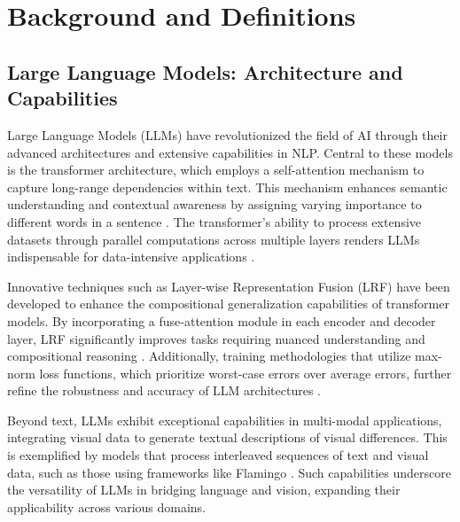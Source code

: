 \section{Background and Definitions} \label{sec:Background and Definitions}



\subsection{Large Language Models: Architecture and Capabilities} \label{subsec:Large Language Models: Architecture and Capabilities}



Large Language Models (LLMs) have revolutionized the field of AI through their advanced architectures and extensive capabilities in NLP. Central to these models is the transformer architecture, which employs a self-attention mechanism to capture long-range dependencies within text. This mechanism enhances semantic understanding and contextual awareness by assigning varying importance to different words in a sentence \cite{bogoychev2020domaintranslationesenoisesynthetic}. The transformer's ability to process extensive datasets through parallel computations across multiple layers renders LLMs indispensable for data-intensive applications \cite{zheng2023layerwiserepresentationfusioncompositional}.



Innovative techniques such as Layer-wise Representation Fusion (LRF) have been developed to enhance the compositional generalization capabilities of transformer models. By incorporating a fuse-attention module in each encoder and decoder layer, LRF significantly improves tasks requiring nuanced understanding and compositional reasoning \cite{zheng2023layerwiserepresentationfusioncompositional}. Additionally, training methodologies that utilize max-norm loss functions, which prioritize worst-case errors over average errors, further refine the robustness and accuracy of LLM architectures \cite{peiris2021deeplearningnonsmoothobjectives}.



Beyond text, LLMs exhibit exceptional capabilities in multi-modal applications, integrating visual data to generate textual descriptions of visual differences. This is exemplified by models that process interleaved sequences of text and visual data, such as those using frameworks like Flamingo \cite{alayrac2022flamingo}. Such capabilities underscore the versatility of LLMs in bridging language and vision, expanding their applicability across various domains.



